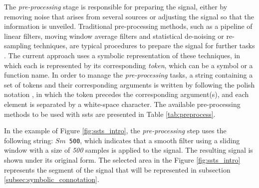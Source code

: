 The \textit{pre-processing} stage is responsible for preparing the signal, either by removing noise that arises from several sources or adjusting the signal so that the information is unveiled. Traditional pre-processing methods, such as a pipeline of linear filters, moving window average filters and statistical de-noising or re-sampling techniques, are typical procedures to prepare the signal for further tasks \cite{preProcessing}. The current approach uses a symbolic representation of these techniques, in which each is represented by its corresponding \textit{token}, which can be a symbol or a function name. In order to manage the \textit{pre-processing} tasks, a string containing a set of tokens and their corresponding arguments is written by following the polish notation \cite{polishNotation}, in which the token precedes the corresponding argument(s), and each element is separated by a white-space character. The available pre-processing methods to be used with \gls{ssts} are presented in Table \ref{tab:preprocess}.
\par
In the example of Figure \ref{fig:ssts_intro}, the \textit{pre-processing} step uses the following string: \texttt{$Sm$ 500}, which indicates that a smooth filter using a sliding window with a size of \textit{500} samples is applied to the signal. The resulting signal is shown under its original form. The selected area in the Figure \ref{fig:ssts_intro} represents the segment of the signal that will be represented in subsection \ref{subsec:symbolic_connotation}.

